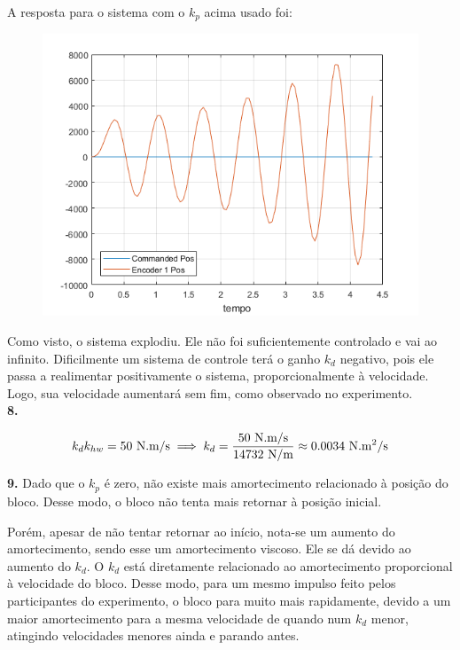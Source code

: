 \documentclass[a4paper,11pt]{article}
\begin{document}
A resposta para o sistema com o $k_p$ acima usado foi:

\begin{figure}[H]
\includegraphics{q07}
\centering
\end{figure}

Como visto, o sistema explodiu. Ele não foi suficientemente controlado e vai ao
infinito. Dificilmente um sistema de controle terá o ganho $k_d$ negativo,
pois ele passa a realimentar positivamente o sistema, proporcionalmente à
velocidade. Logo, sua velocidade aumentará sem fim, como observado no
experimento. \\

\textbf{8.}

\begin{gather*}
    k_d k_{hw} = 50 ~ \text{N.m/s} \implies
        k_d = \frac{50 ~ \text{N.m/s}}{14732 ~ \text{N/m}}
        \approx 0.0034 ~ \text{N.m\textsuperscript{2}/s}
\end{gather*}

\textbf{9.}
Dado que o $k_p$ é zero, não existe mais amortecimento relacionado à posição do
bloco. Desse modo, o bloco não tenta mais retornar à posição inicial.

Porém, apesar de não tentar retornar ao início, nota-se um aumento do
amortecimento, sendo esse um amortecimento viscoso. Ele se dá devido ao aumento
do $k_d$. O $k_d$ está diretamente relacionado ao amortecimento proporcional à
velocidade do bloco. Desse modo, para um mesmo impulso feito pelos participantes
do experimento, o bloco para muito mais rapidamente, devido a um maior
amortecimento para a mesma velocidade de quando num $k_d$ menor, atingindo
velocidades menores ainda e parando antes.
\end{document}
